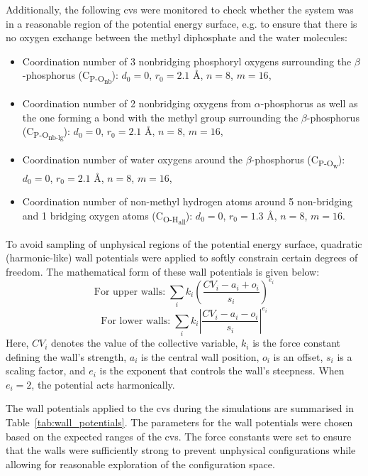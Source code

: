 Additionally, the following \acp{cv} were monitored to check whether the system was in a reasonable region of the potential energy surface, e.g. to ensure that there is no oxygen exchange between the methyl diphosphate and the water molecules:
\begin{itemize}
    \item Coordination number of 3 nonbridging phosphoryl oxygens surrounding the $\beta$-phosphorus (C\textsubscript{P-O\textsubscript{nb}}): $d_0 = 0$, $r_0 = 2.1$ \AA, $n = 8$, $m = 16$,
    \item Coordination number of 2 nonbridging oxygens from $\alpha$-phosphorus as well as the one forming a bond with the methyl group surrounding the $\beta$-phosphorus (C\textsubscript{P-O\textsubscript{nb-lg}}): $d_0 = 0$, $r_0 = 2.1$ \AA, $n = 8$, $m = 16$,
    \item Coordination number of water oxygens around the $\beta$-phosphorus (C\textsubscript{P-O\textsubscript{w}}): $d_0 = 0$, $r_0 = 2.1$ \AA, $n = 8$, $m = 16$,
    \item Coordination number of non-methyl hydrogen atoms around 5 non-bridging and 1 bridging oxygen atoms (C\textsubscript{O-H\textsubscript{all}}): $d_0 = 0$, $r_0 = 1.3$ \AA, $n = 8$, $m = 16$.
\end{itemize}

To avoid sampling of unphysical regions of the potential energy surface, quadratic (harmonic-like) wall potentials were applied to softly constrain certain degrees of freedom. The mathematical form of these wall potentials is given below:
\begin{equation}
    \text{For upper walls:} \; \sum_i k_i \left( \frac{CV_i - a_i + o_i}{s_i} \right)^{e_i}
    \label{eq:upper_wall}
\end{equation}
\begin{equation}
    \text{For lower walls:} \; \sum_i k_i \left| \frac{CV_i - a_i - o_i}{s_i} \right|^{e_i}
    \label{eq:lower_wall}
\end{equation}
Here, $CV_i$ denotes the value of the collective variable, $k_i$ is the force constant defining the wall's strength, $a_i$ is the central wall position, $o_i$ is an offset, $s_i$ is a scaling factor, and $e_i$ is the exponent that controls the wall's steepness. When $e_i = 2$, the potential acts harmonically.

The wall potentials applied to the \acp{cv} during the simulations are summarised in Table~\ref{tab:wall_potentials}. The parameters for the wall potentials were chosen based on the expected ranges of the \acp{cv}. The force constants were set to ensure that the walls were sufficiently strong to prevent unphysical configurations while allowing for reasonable exploration of the configuration space.

